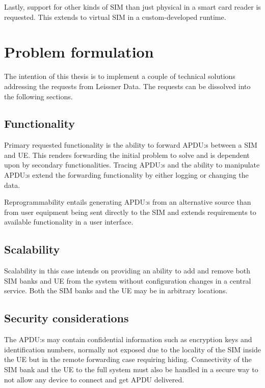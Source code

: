 Lastly, support for other kinds of SIM than just physical in a
smart card reader is requested. This extends to virtual SIM in
a custom-developed runtime.

\section{Problem formulation}

The intention of this thesis is to implement a couple of technical
solutions addressing the requests from Leissner Data. The requests
can be dissolved into the following sections.

\subsection{Functionality}

Primary requested functionality is the ability to forward APDU:s
between a SIM and UE. This renders forwarding the initial problem
to solve and is dependent upon by secondary functionalities.
Tracing APDU:s and the ability to manipulate APDU:s extend the
forwarding functionality by either logging or changing the data.

Reprogrammability entails generating APDU:s from an alternative
source than from user equipment being sent directly to the SIM and
extends requirements to available functionality in a user
interface.

\subsection{Scalability}

Scalability in this case intends on providing an ability to add and
remove both SIM banks and UE from the system without configuration
changes in a central service. Both the SIM banks and the UE may be
in arbitrary locations.

\subsection{Security considerations}

The APDU:s may contain confidential information such as encryption
keys and identification numbers, normally not exposed due to the
locality of the SIM inside the UE but in the remote forwarding case
requiring hiding. Connectivity of the SIM bank and the UE to the
full system must also be handled in a secure way to not allow any
device to connect and get APDU delivered.

